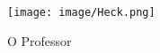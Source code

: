 \begin{figure}[!h]
    \centering
    \texttt{[image: image/Heck.png]}
    \caption{O Professor}
\end{figure}